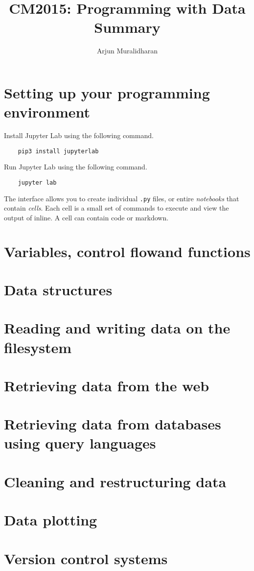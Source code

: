
\title{CM2015: Programming with Data \\ Summary}
\author{Arjun Muralidharan}



\section{Setting up your programming environment}
Install Jupyter Lab using the following command.

\begin{verbatim}
	pip3 install jupyterlab
\end{verbatim}

Run Jupyter Lab using the following command.

\begin{verbatim}
	jupyter lab
\end{verbatim}

The interface allows you to create individual \texttt{.py} files, or entire \emph{notebooks} that contain \emph{cells}. Each cell is a small set of commands to execute and view the output of inline. A cell can contain code or markdown.

\section{Variables, control flowand functions}
\section{Data structures}
\section{Reading and writing data on the filesystem}
\section{Retrieving data from the web}
\section{Retrieving data from databases using query languages}
\section{Cleaning and restructuring data}
\section{Data plotting}
\section{Version control systems}



